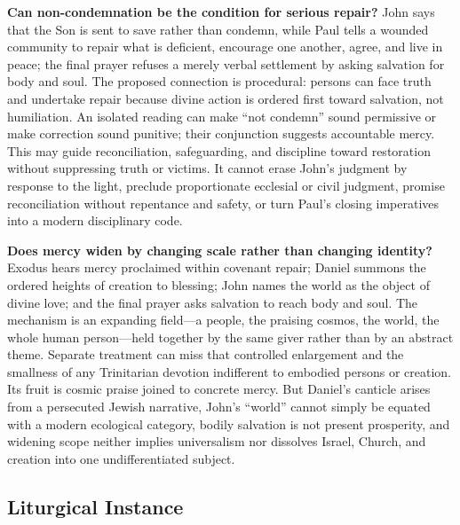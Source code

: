 \begin{deepstudy}
\noindent\textbf{Can non-condemnation be the condition for serious repair?\enspace{}}
John says that the Son is sent to save rather than condemn, while Paul tells a wounded community to repair what is deficient, encourage one another, agree, and live in peace; the final prayer refuses a merely verbal settlement by asking salvation for body and soul. The proposed connection is procedural: persons can face truth and undertake repair because divine action is ordered first toward salvation, not humiliation. An isolated reading can make “not condemn” sound permissive or make correction sound punitive; their conjunction suggests accountable mercy. This may guide reconciliation, safeguarding, and discipline toward restoration without suppressing truth or victims. It cannot erase John's judgment by response to the light, preclude proportionate ecclesial or civil judgment, promise reconciliation without repentance and safety, or turn Paul's closing imperatives into a modern disciplinary code.

\noindent\textbf{Does mercy widen by changing scale rather than changing identity?\enspace{}}
Exodus hears mercy proclaimed within covenant repair; Daniel summons the ordered heights of creation to blessing; John names the world as the object of divine love; and the final prayer asks salvation to reach body and soul. The mechanism is an expanding field---a people, the praising cosmos, the world, the whole human person---held together by the same giver rather than by an abstract theme. Separate treatment can miss that controlled enlargement and the smallness of any Trinitarian devotion indifferent to embodied persons or creation. Its fruit is cosmic praise joined to concrete mercy. But Daniel's canticle arises from a persecuted Jewish narrative, John's “world” cannot simply be equated with a modern ecological category, bodily salvation is not present prosperity, and widening scope neither implies universalism nor dissolves Israel, Church, and creation into one undifferentiated subject.

\clearpage

\pcresolutionappendix

\subsection*{Liturgical Instance}


\end{deepstudy}
